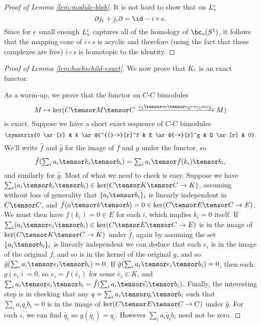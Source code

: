\begin{proof}[Proof of Lemma \ref{lem:module-blob}]
It is not hard to show that on $L_*^\epsilon$
\[
	\bd j_\ep  + j_\ep \bd = \id - i \circ s .
\]
Since for $\epsilon$ small enough $L_*^\epsilon$ captures all of the
homology of $\bc_*(S^1)$, 
it follows that the mapping cone of $i \circ s$ is acyclic and therefore (using the fact that
these complexes are free) $i \circ s$ is homotopic to the identity.
\end{proof}

\begin{proof}[Proof of Lemma \ref{lem:hochschild-exact}]
We now prove that $K_*$ is an exact functor.

As a warm-up, we prove
that the functor on $C$-$C$ bimodules
\begin{equation*}
M \mapsto \ker(C \tensor M \tensor C \xrightarrow{c_1 \tensor m \tensor c_2 \mapsto c_1 m c_2} M)
\end{equation*}
is exact.
Suppose we have a short exact sequence of $C$-$C$ bimodules $$\xymatrix{0 \ar[r] & K \ar@{^{(}->}[r]^f & E \ar@{->>}[r]^g & Q \ar[r] & 0}.$$
We'll write $\hat{f}$ and $\hat{g}$ for the image of $f$ and $g$ under the functor, so 
\[
	\hat{f}(\textstyle\sum_i a_i \tensor k_i \tensor b_i) = 
						\textstyle\sum_i a_i \tensor f(k_i) \tensor b_i ,
\]
and similarly for $\hat{g}$.
Most of what we need to check is easy.
Suppose we have $\sum_i (a_i \tensor k_i \tensor b_i) \in \ker(C \tensor K \tensor C \to K)$, assuming without loss of generality that $\{a_i \tensor b_i\}_i$ is linearly independent in $C \tensor C$, and $\hat{f}(a \tensor k \tensor b) = 0 \in \ker(C \tensor E \tensor C \to E)$. We must then have $f(k_i) = 0 \in E$ for each $i$, which implies $k_i=0$ itself. 
If $\sum_i (a_i \tensor e_i \tensor b_i) \in \ker(C \tensor E \tensor C \to E)$ is in the image of $\ker(C \tensor K \tensor C \to K)$ under $\hat{f}$, again by assuming the set  $\{a_i \tensor b_i\}_i$ is linearly independent we can deduce that each
$e_i$ is in the image of the original $f$, and so is in the kernel of the original $g$, and so $\hat{g}(\sum_i a_i \tensor e_i \tensor b_i) = 0$.
If $\hat{g}(\sum_i a_i \tensor e_i \tensor b_i) = 0$, then each $g(e_i) = 0$, so $e_i = f(\widetilde{e_i})$ for some $\widetilde{e_i} \in K$, and $\sum_i a_i \tensor e_i \tensor b_i = \hat{f}(\sum_i a_i \tensor \widetilde{e_i} \tensor b_i)$.
Finally, the interesting step is in checking that any $q = \sum_i a_i \tensor q_i \tensor b_i$ such that $\sum_i a_i q_i b_i = 0$ is in the image of $\ker(C \tensor E \tensor C \to C)$ under $\hat{g}$.
For each $i$, we can find $\widetilde{q_i}$ so $g(\widetilde{q_i}) = q_i$. However $\sum_i a_i \widetilde{q_i} b_i$ need not be zero.

\end{proof}
